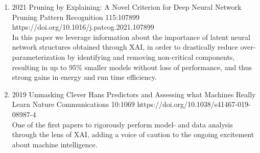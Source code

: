 \begin{enumerate}[resume]
            
            \item {}
                        {2021}
                        {Pruning by Explaining: A Novel Criterion for Deep Neural Network Pruning}
                        {Pattern Recognition}
                        {115:107899}
                        {https://doi.org/10.1016/j.patcog.2021.107899}
                        {\\
                        In this paper we leverage information about the importance of latent neural network structures obtained through XAI, in order to drastically reduce over-parameterization by identifying and removing non-critical components, resulting in up to 95\% smaller models without loss of performance, and thus strong gains in energy and run time efficiency.
                        }
                        
                        
                            
                            
            \item
                            {2019}
                            {Unmasking Clever Hans Predictors and Assessing what Machines Really Learn}
                            {Nature Communications}
                            {10:1069}
                            {https://doi.org/10.1038/s41467-019-08987-4}
                            {\\
                            One of the first papers to rigorously
                            perform model- and data analysis through the lens of XAI, adding a voice of caution to the ongoing excitement about machine intelligence.}


\end{enumerate}

